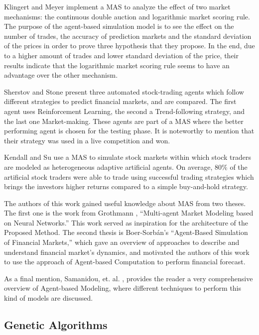 \documentclass[12pt,journal,draftcls,onecolumn]{IEEEtran}
\begin{document}
Klingert and Meyer \cite{Klingert_2012} implement a MAS to analyze the effect of two market mechanisms: the continuous double auction and logarithmic market scoring rule. The purpose of the agent-based simulation model is to see the effect on the number of trades, the accuracy of prediction markets and the standard deviation of the prices in order to prove three hypothesis that they propose. In the end, due to a higher amount of trades and lower standard deviation of the price, their results indicate that the logarithmic market scoring rule seems to have an advantage over the other mechanism.

Sherstov and Stone \cite{Sherstov2005} present three automated stock-trading agents which follow different strategies to predict financial markets, and are compared. The first agent uses Reinforcement Learning, the second a Trend-following strategy, and the last one Market-making. These agents are part of a MAS where the better performing agent is chosen for the testing phase. It is noteworthy to mention that their strategy was used in a live competition and won.

Kendall and Su \cite{Kendall2003} use a MAS to simulate stock markets within which stock traders are modeled as heterogeneous adaptive artificial agents. On average, 80\% of the artificial stock traders were able to trade using successful trading strategies which brings the investors higher returns compared to a simple buy-and-hold strategy.

The authors of this work gained useful knowledge about MAS from two theses. The first one is the work from Grothmann \cite{Grothmann2002}, ``Multi-agent Market Modeling based on Neural Networks.'' This work served as inspiration for the architecture of the Proposed Method. The second thesis is Boer-Sorb{\'{a}}n's ``Agent-Based Simulation of Financial Markets,'' which gave an overview of approaches to describe and understand financial market's dynamics, and motivated the authors of this work to use the approach of Agent-based Computation to perform financial forecast.

As a final mention, Samanidou, et. al. \cite{Samanidou_2007}, provides the reader a very comprehensive overview of Agent-based Modeling, where different techniques to perform this kind of models are discussed.

\subsection{Genetic Algorithms}
\label{genetic-algorithms}
\end{document}
